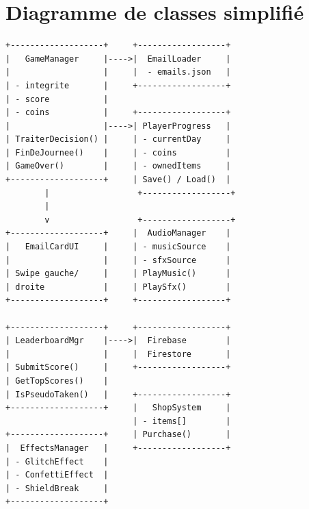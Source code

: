 \documentclass[12pt,a4paper]{article}
\begin{document}
\section{Diagramme de classes simplifié}

\begin{verbatim}
+-------------------+     +------------------+
|   GameManager     |---->|  EmailLoader     |
|                   |     |  - emails.json   |
| - integrite       |     +------------------+
| - score           |
| - coins           |     +------------------+
|                   |---->| PlayerProgress   |
| TraiterDecision() |     | - currentDay     |
| FinDeJournee()    |     | - coins          |
| GameOver()        |     | - ownedItems     |
+-------------------+     | Save() / Load()  |
        |                  +------------------+
        |
        v                  +------------------+
+-------------------+     |  AudioManager    |
|   EmailCardUI     |     | - musicSource    |
|                   |     | - sfxSource      |
| Swipe gauche/     |     | PlayMusic()      |
| droite            |     | PlaySfx()        |
+-------------------+     +------------------+

+-------------------+     +------------------+
| LeaderboardMgr    |---->|  Firebase        |
|                   |     |  Firestore       |
| SubmitScore()     |     +------------------+
| GetTopScores()    |
| IsPseudoTaken()   |     +------------------+
+-------------------+     |   ShopSystem     |
                          | - items[]        |
+-------------------+     | Purchase()       |
|  EffectsManager   |     +------------------+
| - GlitchEffect    |
| - ConfettiEffect  |
| - ShieldBreak     |
+-------------------+
\end{verbatim}
\end{document}
